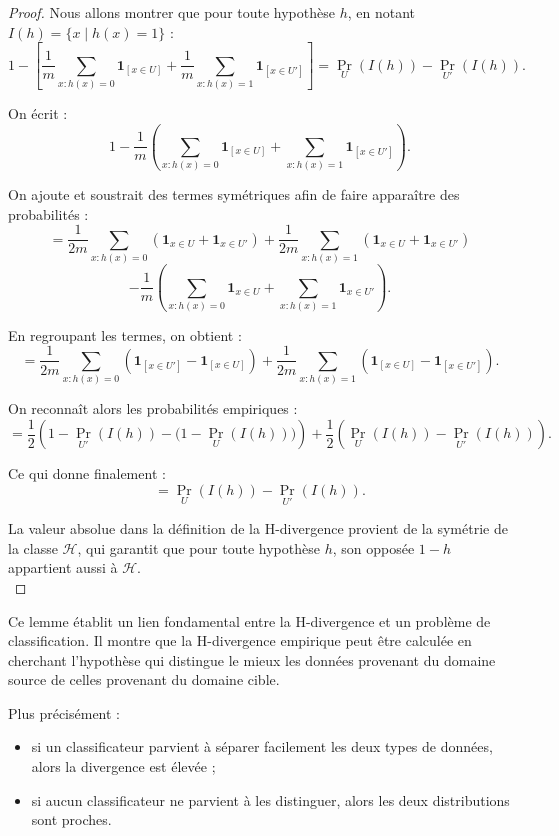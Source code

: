 \documentclass[a4paper,12pt]{article}
\theoremstyle{definition}
\theoremstyle{remark}
\begin{document}
\begin{proof}

Nous allons montrer que pour toute hypothèse $h$, en notant $I(h) = \{x \mid h(x)=1\}$ :
\[
1 - \left[
\frac{1}{m} \sum_{x : h(x)=0} \mathbf{1}_{[{x \in U}]} + \frac{1}{m} \sum_{x : h(x)=1} \mathbf{1}_{[{x \in U'}]}
\right]
= \Pr_U(I(h)) - \Pr_{U'}(I(h)).
\]

On écrit :
\[
1 - \frac{1}{m} \left(
\sum_{x : h(x)=0} \mathbf{1}_{[{x \in U}]} + \sum_{x : h(x)=1} \mathbf{1}_{[{x \in U'}]}
\right).
\]

On ajoute et soustrait des termes symétriques afin de faire apparaître des probabilités :
\[
= \frac{1}{2m} \sum_{x : h(x)=0} \left(\mathbf{1}_{x \in U} + \mathbf{1}_{x \in U'}\right)
+ \frac{1}{2m} \sum_{x : h(x)=1} \left(\mathbf{1}_{x \in U} + \mathbf{1}_{x \in U'}\right)
\]
\[
- \frac{1}{m} \left(
\sum_{x : h(x)=0} \mathbf{1}_{x \in U}
+ \sum_{x : h(x)=1} \mathbf{1}_{x \in U'}
\right).
\]

En regroupant les termes, on obtient :
\[
= \frac{1}{2m} \sum_{x : h(x)=0} \left(\mathbf{1}_{[{x \in U'}]} - \mathbf{1}_{[{x \in U}]}\right)
+ \frac{1}{2m} \sum_{x : h(x)=1} \left(\mathbf{1}_{[{x \in U}]} - \mathbf{1}_{[{x \in U'}]}\right).
\]

On reconnaît alors les probabilités empiriques :
\[
= \frac{1}{2}\left(1 - \Pr_{U'}(I(h)) - \bigl(1 - \Pr_U(I(h))\bigr)\right)
+ \frac{1}{2}\left(\Pr_U(I(h)) - \Pr_{U'}(I(h))\right).
\]

Ce qui donne finalement :
\[
= \Pr_U(I(h)) - \Pr_{U'}(I(h)).
\]

La valeur absolue dans la définition de la H-divergence provient de la symétrie de la classe $\mathcal{H}$, qui garantit que pour toute hypothèse $h$, son opposée $1-h$ appartient aussi à $\mathcal{H}$.\\
\end{proof}


Ce lemme établit un lien fondamental entre la H-divergence et un problème de classification. Il montre que la H-divergence empirique peut être calculée en cherchant l’hypothèse qui distingue le mieux les données provenant du domaine source de celles provenant du domaine cible.

Plus précisément :
\begin{itemize}
\item si un classificateur parvient à séparer facilement les deux types de données, alors la divergence est élevée ;
\item si aucun classificateur ne parvient à les distinguer, alors les deux distributions sont proches.
\end{itemize}
\end{document}
